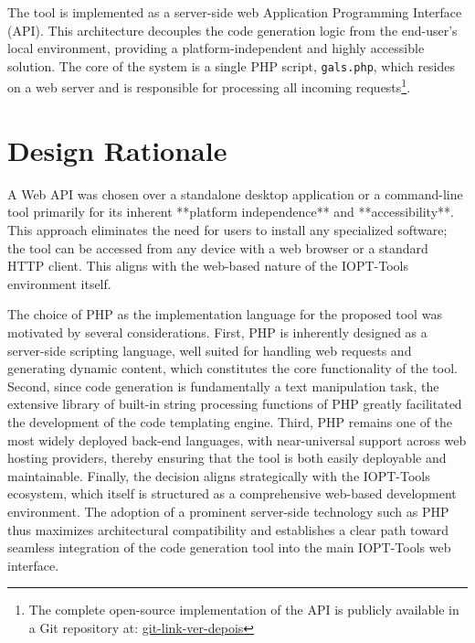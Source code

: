 The tool is implemented as a server-side web Application Programming Interface (API). This architecture decouples the code generation logic from the end-user's local environment, providing a platform-independent and highly accessible solution. The core of the system is a single PHP script, \texttt{gals.php}, which resides on a web server and is responsible for processing all incoming requests\footnote{The complete open-source implementation of the API is publicly available in a Git repository at: \url{git-link-ver-depois}}.


\section{Design Rationale}
\label{sec:design_rationale}

A Web API was chosen over a standalone desktop application or a command-line tool primarily for its inherent **platform independence** and **accessibility**. This approach eliminates the need for users to install any specialized software; the tool can be accessed from any device with a web browser or a standard HTTP client. This aligns with the web-based nature of the IOPT-Tools environment itself.

The choice of PHP as the implementation language for the proposed tool was motivated by several considerations. First, PHP is inherently designed as a server-side scripting language, well suited for handling web requests and generating dynamic content, which constitutes the core functionality of the tool. Second, since code generation is fundamentally a text manipulation task, the extensive library of built-in string processing functions of PHP greatly facilitated the development of the code templating engine. Third, PHP remains one of the most widely deployed back-end languages, with near-universal support across web hosting providers, thereby ensuring that the tool is both easily deployable and maintainable. Finally, the decision aligns strategically with the IOPT-Tools ecosystem, which itself is structured as a comprehensive web-based development environment. The adoption of a prominent server-side technology such as PHP thus maximizes architectural compatibility and establishes a clear path toward seamless integration of the code generation tool into the main IOPT-Tools web interface.

